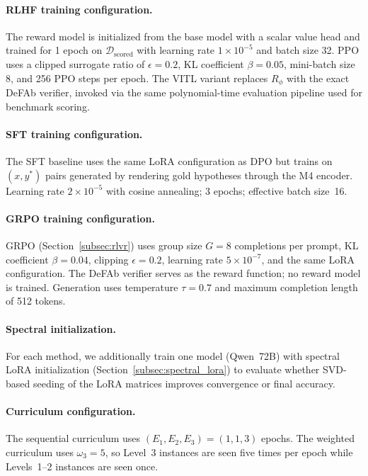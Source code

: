 \documentclass{article}
\theoremstyle{definition}
\begin{document}
\paragraph{RLHF training configuration.} The reward model is initialized from the base model with a scalar value head and trained for 1 epoch on $\mathcal{D}_{\mathrm{scored}}$ with learning rate $1 \times 10^{-5}$ and batch size 32. PPO uses a clipped surrogate ratio of $\epsilon = 0.2$, KL coefficient $\beta = 0.05$, mini-batch size 8, and 256 PPO steps per epoch. The VITL variant replaces $R_\phi$ with the exact DeFAb verifier, invoked via the same polynomial-time evaluation pipeline used for benchmark scoring.

\paragraph{SFT training configuration.} The SFT baseline uses the same LoRA configuration as DPO but trains on $(x, y^*)$ pairs generated by rendering gold hypotheses through the M4 encoder. Learning rate $2 \times 10^{-5}$ with cosine annealing; 3 epochs; effective batch size~16.

\paragraph{GRPO training configuration.} GRPO (Section~\ref{subsec:rlvr}) uses group size $G = 8$ completions per prompt, KL coefficient $\beta = 0.04$, clipping $\epsilon = 0.2$, learning rate $5 \times 10^{-7}$, and the same LoRA configuration.  The DeFAb verifier serves as the reward function; no reward model is trained.  Generation uses temperature $\tau = 0.7$ and maximum completion length of 512 tokens.

\paragraph{Spectral initialization.} For each method, we additionally train one model (Qwen~72B) with spectral LoRA initialization (Section~\ref{subsec:spectral_lora}) to evaluate whether SVD-based seeding of the LoRA matrices improves convergence or final accuracy.

\paragraph{Curriculum configuration.} The sequential curriculum uses $(E_1, E_2, E_3) = (1, 1, 3)$ epochs. The weighted curriculum uses $\omega_3 = 5$, so Level~3 instances are seen five times per epoch while Levels~1--2 instances are seen once.
\end{document}
